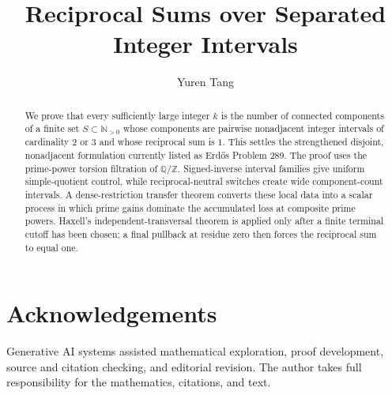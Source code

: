 \documentclass[11pt,a4paper,reqno]{amsart}
\title[Reciprocal Sums over Separated Intervals]{Reciprocal Sums over Separated Integer Intervals}
\author{Yuren Tang}
\date{}
\theoremstyle{definition}
\theoremstyle{remark}
\newcommand{\N}{\mathbb N}
\newcommand{\Q}{\mathbb Q}
\newcommand{\Z}{\mathbb Z}
\numberwithin{equation}{section}
\begin{document}
\begin{abstract}
We prove that every sufficiently large integer $k$ is the number of connected components of a finite set $S\subset\N_{>0}$ whose components are pairwise nonadjacent integer intervals of cardinality $2$ or $3$ and whose reciprocal sum is $1$.  This settles the strengthened disjoint, nonadjacent formulation currently listed as Erd\H{o}s Problem 289.  The proof uses the prime-power torsion filtration of $\Q/\Z$.  Signed-inverse interval families give uniform simple-quotient control, while reciprocal-neutral switches create wide component-count intervals.  A dense-restriction transfer theorem converts these local data into a scalar process in which prime gains dominate the accumulated loss at composite prime powers.  Haxell's independent-transversal theorem is applied only after a finite terminal cutoff has been chosen; a final pullback at residue zero then forces the reciprocal sum to equal one.
\end{abstract}

\maketitle











\appendix




\section*{Acknowledgements}
Generative AI systems assisted mathematical exploration, proof development, source and citation checking, and editorial revision. The author takes full responsibility for the mathematics, citations, and text.

\printbibliography
\end{document}
